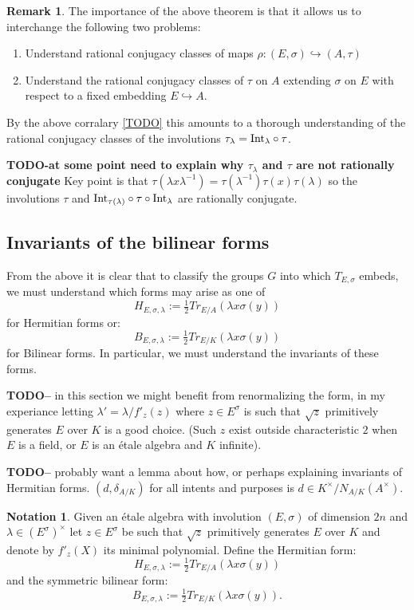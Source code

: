 \documentclass{article}
\theoremstyle{plain}
\theoremstyle{definition}
\newtheorem{notation}[theorem]{Notation}
\newtheorem{remark}[theorem]{Remark}
\numberwithin{equation}{section}
\newcommand{\TODO}[1]{\textbf{TODO-#1}}
\begin{document}
\begin{remark}
The importance of the above theorem is that it allows us to interchange the following two problems:
\begin{enumerate}
\item Understand rational conjugacy classes of maps $\rho: (E,\sigma) \hookrightarrow (A,\tau)$
\item Understand the rational conjugacy classes of $\tau$ on $A$ extending $\sigma$ on $E$ with respect to a fixed embedding $E\hookrightarrow A$.
\end{enumerate}
By the above corralary \ref{TODO} this amounts to a thorough understanding of the rational conjugacy classes of the involutions $\tau_\lambda =  {\rm Int}_\lambda\circ\tau$.


\TODO{at some point need to explain why $\tau_\lambda$ and $\tau$ are not rationally conjugate}
Key point is that $\tau(\lambda x \lambda^{-1}) = \tau(\lambda^{-1}) \tau(x) \tau(\lambda)$ so the involutions $\tau$ and ${\rm Int}_{\tau(\lambda)}\circ \tau\circ {\rm Int}_\lambda$ are rationally conjugate.
\end{remark}

 



\subsection{Invariants of the bilinear forms}

From the above it is clear that to classify the groups $G$ into which $T_{E,\sigma}$ embeds, we must understand which forms may arise as one of
\[ H_{E,\sigma,\lambda} := \tfrac{1}{2}Tr_{E/A}\left(\lambda x\sigma(y)\right) \]
for Hermitian forms or:
\[ B_{E,\sigma,\lambda} := \tfrac{1}{2}Tr_{E/K}\left(\lambda x\sigma(y)\right) \]
for Bilinear forms.
In particular, we must understand the invariants of these forms.

\TODO - in this section we might benefit from renormalizing the form, in my experiance letting $\lambda' = \lambda/f'_z(z)$ where $z\in E^\sigma$ is such that $\sqrt{z}$ primitively generates $E$ over $K$ is a good choice.
(Such $z$ exist outside characteristic $2$ when $E$ is a field, or $E$ is an \'etale algebra and $K$ infinite).

\TODO - probably want a lemma about how, or perhaps explaining invariants of Hermitian forms.
$(d,\delta_{A/K}) $ for all intents and purposes is $d \in K^\times/N_{A/K}(A^\times)$.

\begin{notation}
Given an \'etale algebra with involution $(E,\sigma)$ of dimension $2n$ and $\lambda \in (E^\sigma)^\times$ let $z\in E^\sigma$ be such that $\sqrt{z}$ primitively generates $E$ over $K$ and denote by $f'_z(X)$ its minimal polynomial.
Define the Hermitian form:
\[ H_{E,\sigma,\lambda} := \tfrac{1}{2}Tr_{E/A}\left(\lambda x\sigma(y)\right) \]
and the symmetric bilinear form:
\[ B_{E,\sigma,\lambda} := \tfrac{1}{2}Tr_{E/K}\left(\lambda x\sigma(y)\right). \]
\end{notation}
\end{document}
